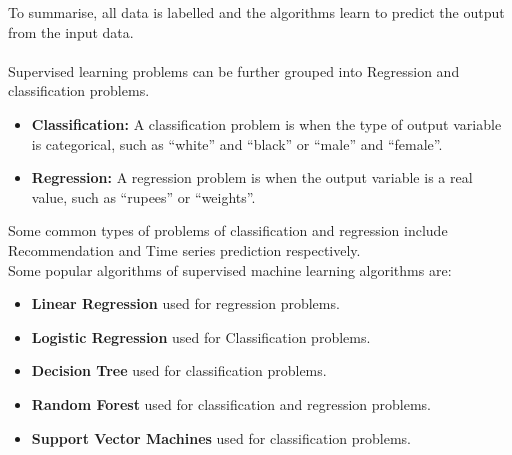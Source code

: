 \documentclass[Proceedings]{ascelike}
\begin{document}

To summarise, all data is labelled and the algorithms learn to predict the output from the input data.\\
\\Supervised learning problems can be further grouped into Regression and classification problems.

\begin{itemize}
	\item \textbf{Classification:} A classification problem is when the type of output variable is categorical, such as “white” and “black” or “male” and “female”.
	\item \textbf{Regression:} A regression problem is when the output variable is a real value, such as “rupees” or “weights”.
\end{itemize}
Some common types of problems of classification and regression include Recommendation and Time series prediction respectively.
\\Some popular algorithms of supervised machine learning algorithms are:
\begin{itemize}
	\item \textbf{Linear Regression} used for regression problems.
	\item \textbf{Logistic Regression} used for Classification problems.
	\item \textbf{Decision Tree} used for classification problems.
	\item \textbf{Random Forest} used for classification and regression problems.
	\item \textbf{Support Vector Machines} used for classification problems.
	
\end{itemize}
\end{document}
